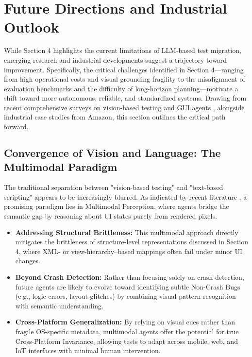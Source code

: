 \documentclass[acmsmall,nonacm]{acmart}
\begin{document}
\section{Future Directions and Industrial Outlook}
While Section 4 highlights the current limitations of LLM-based test migration, emerging research and industrial developments suggest a trajectory toward improvement. Specifically, the critical challenges identified in Section 4—ranging from high operational costs and visual grounding fragility to the misalignment of evaluation benchmarks and the difficulty of long-horizon planning—motivate a shift toward more autonomous, reliable, and standardized systems. Drawing from recent comprehensive surveys on vision-based testing and GUI agents \cite{yu2025visionbasedmobileappgui,zhang2025largelanguagemodelbrainedgui}, alongside industrial case studies from Amazon\cite{prakash2025streamlineAWS}, this section outlines the critical path forward.

\subsection{Convergence of Vision and Language: The Multimodal Paradigm}
The traditional separation between "vision-based testing" and "text-based scripting" appears to be increasingly blurred. As indicated by recent literature \cite{yu2025visionbasedmobileappgui}, a promising paradigm lies in Multimodal Perception, where agents bridge the semantic gap by reasoning about UI states purely from rendered pixels.
\begin{itemize}
    \item \textbf{Addressing Structural Brittleness:} This multimodal approach directly mitigates the brittleness of structure-level representations discussed in Section 4, where XML- or view-hierarchy–based mappings often fail under minor UI changes.
    \item \textbf{Beyond Crash Detection:} Rather than focusing solely on crash detection, future agents are likely to evolve toward identifying subtle Non-Crash Bugs (e.g., logic errors, layout glitches) by combining visual pattern recognition with semantic understanding.
    \item \textbf{Cross-Platform Generalization:} By relying on visual cues rather than fragile OS-specific metadata, multimodal agents offer the potential for true Cross-Platform Invariance, allowing tests to adapt across mobile, web, and IoT interfaces with minimal human intervention.
\end{itemize}
\end{document}
